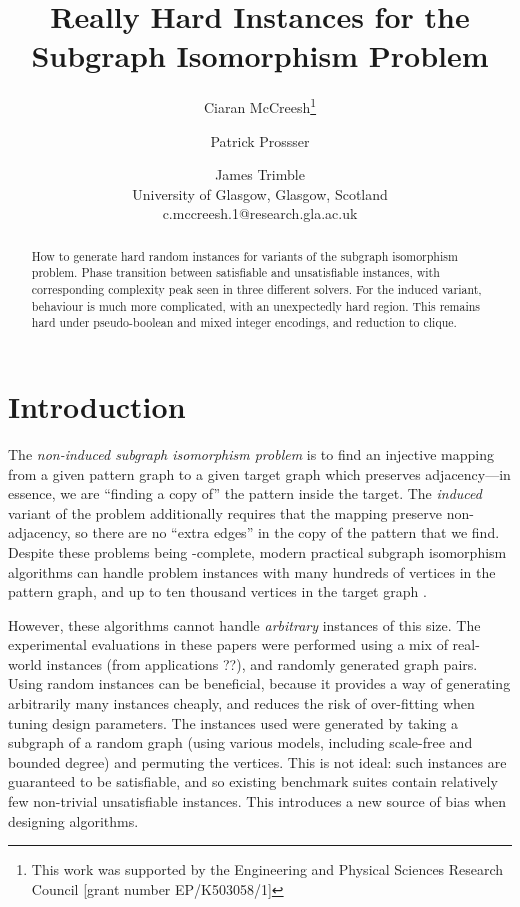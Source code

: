 \documentclass[letterpaper]{article}
\title{Really Hard Instances for the Subgraph Isomorphism Problem}
\author{Ciaran McCreesh\thanks{This work was supported by the Engineering and Physical Sciences
    Research Council [grant number EP/K503058/1]} \and Patrick Prossser \and James Trimble \\
University of Glasgow, Glasgow, Scotland \\
c.mccreesh.1@research.gla.ac.uk}
\begin{document}
\maketitle

\begin{abstract}
    How to generate hard random instances for variants of the subgraph isomorphism problem. Phase
    transition between satisfiable and unsatisfiable instances, with corresponding complexity peak
    seen in three different solvers. For the induced variant, behaviour is much more complicated,
    with an unexpectedly hard region. This remains hard under pseudo-boolean and mixed integer
    encodings, and reduction to clique.
\end{abstract}

\section{Introduction}

The \emph{non-induced subgraph isomorphism problem} is to find an injective mapping from a given
pattern graph to a given target graph which preserves adjacency---in essence, we are ``finding a
copy of'' the pattern inside the target. The \emph{induced} variant of the problem additionally
requires that the mapping preserve non-adjacency, so there are no ``extra edges'' in the copy of the
pattern that we find. Despite these problems being \NP-complete, modern practical subgraph
isomorphism algorithms can handle problem instances with many hundreds of vertices in the pattern
graph, and up to ten thousand vertices in the target graph
\cite{Cordella:2004,Solnon:2010,Audemard:2014,McCreesh:2015}.

However, these algorithms cannot handle \emph{arbitrary} instances of this size. The experimental
evaluations in these papers were performed using a mix of real-world instances (from applications
??), and randomly generated graph pairs. Using random instances can be beneficial, because it
provides a way of generating arbitrarily many instances cheaply, and reduces the risk of
over-fitting when tuning design parameters. The instances used were generated by taking a subgraph
of a random graph (using various models, including scale-free and bounded degree) and permuting the
vertices.  This is not ideal: such instances are guaranteed to be satisfiable, and so existing
benchmark suites contain relatively few non-trivial unsatisfiable instances. This introduces a new
source of bias when designing algorithms.
\end{document}
